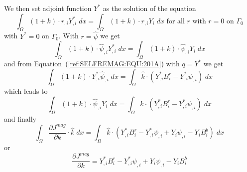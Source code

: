 We then set adjoint function $Y^*$ as the solution of the equation 
\begin{equation}\label{ref:SELFREMAG:EQU:202d}
\int_{\Omega} (1+k) \cdot r_{,i} Y^*_{,i} \; dx  =  \int_{\Omega} (1+k) \cdot  r_{,i} Y_i  \; dx  \mbox{ for all } r \mbox{ with } r=0 \mbox{ on } \Gamma_{0}
\end{equation} 
with $Y^*=0$ on $\Gamma_{0}$. With $r=\hat{\psi}$ we get
\begin{equation}\label{ref:SELFREMAG:EQU:202dd}
\int_{\Omega} (1+k) \cdot  \hat{\psi}_{,i} Y^*_{,i} \; dx  =  \int_{\Omega}  (1+k)  \cdot \hat{\psi}_{,i} Y_i  \; dx
\end{equation} 
and from Equation~(\ref{ref:SELFREMAG:EQU:201A}) with $q=Y^*$ we get
\begin{equation}\label{ref:SELFREMAG:EQU:20e}
\int_{\Omega} (1+k) \cdot  Y^*_{,i}  \hat{\psi}_{,i} \; dx  = \int_{\Omega} \hat{k} \cdot  \left(   Y^*_{,i}  B^r_i - Y^*_{,i} \psi_{,i}  \right) \; dx  
\end{equation}
which leads to 
\begin{equation}\label{ref:SELFREMAG:EQU:20ee}
\int_{\Omega} (1+k)  \cdot \hat{\psi}_{,i} Y_i   \; dx  = 
\int_{\Omega} \hat{k} \cdot  \left(   Y^*_{,i}  B^r_i - Y^*_{,i} \psi_{,i}  \right) \; dx  
\end{equation}
and finally
\begin{equation}\label{ref:SELFREMAG:EQU:201a}
\int_{\Omega}   \frac{\partial J^{mag}}{\partial k} \cdot \hat{k} \;  dx  = \int_{\Omega}  
\hat{k} \cdot  \left(   Y^*_{,i}  B^r_i - Y^*_{,i} \psi_{,i} 
                         + Y_i \psi_{,i} - Y_i B^b_i
 \right) 
 \; dx  
\end{equation} 
or 
\begin{equation}\label{ref:SELFREMAG:EQU:201b}
\frac{\partial J^{mag}}{\partial k} =  Y^*_{,i}  B^r_i - Y^*_{,i} \psi_{,i} 
                         + Y_i \psi_{,i} - Y_i B^b_i
\end{equation}

